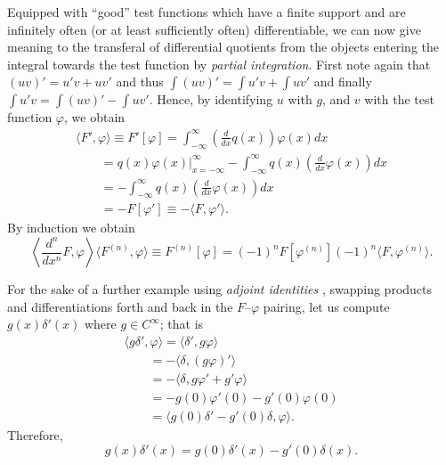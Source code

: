 Equipped with ``good'' test functions
which have a finite support and are
infinitely often (or at least sufficiently often) differentiable,
we can now give meaning to the transferal  of differential quotients from
the objects entering the integral towards the test function by {\em partial integration}.
First note again that $(uv)' = u'v+uv'$
and thus
$\int (uv)' = \int u'v+\int uv'$
and finally   $\int u'v = \int (uv)'  -\int uv'$.
Hence,     by identifying $u$ with $g$, and $v$ with the test function $\varphi$, we obtain
\begin{equation}
\begin{split}
\langle {F}' , \varphi \rangle \equiv {F}'\left[\varphi\right] =
\int_{-\infty}^\infty
\left( \frac{d}{dx} q(x)\right) \varphi (x) dx
\\
\qquad =
\left. q(x) \varphi (x) \right|_{x=-\infty}^\infty
- \int_{-\infty}^\infty
q(x)\left( \frac{d}{dx} \varphi (x) \right) dx \\
\qquad =
- \int_{-\infty}^\infty
q(x)\left( \frac{d}{dx} \varphi (x) \right) dx \\
\qquad =-F\left[\varphi  '\right] \equiv - \langle {F} , \varphi '\rangle .
\end{split}
\end{equation}
By induction we obtain
\begin{equation}
\left\langle \frac{d^{n}}{dx^{n}}{F} , \varphi \right\rangle
\langle {F}^{(n)} , \varphi \rangle \equiv F^{(n)}\left[\varphi\right]
 =(-1)^n F\left[\varphi  ^{(n)}\right]
 (-1)^n   \langle {F} , \varphi^{(n)}\rangle.
\end{equation}


{
\color{blue}
\bexample
For the sake of a further example using {\em adjoint identities}
,
swapping products and differentiations forth and back
in the $F$--$\varphi$ pairing, let us compute
$g(x)\delta' (x)$ where $g \in C^\infty$; that is
\begin{equation}
\begin{split}
\langle g \delta'   , \varphi \rangle
=
\langle \delta'   , g  \varphi \rangle
\\
\qquad =
- \langle \delta   , (g  \varphi )'\rangle
\\
\qquad =
- \langle \delta   ,  g  \varphi  '+ g'  \varphi  \rangle
\\
\qquad =
-  g(0)  \varphi ' (0) - g'(0)  \varphi(0)
\\
\qquad =
  \langle g(0) \delta '   -  g'(0)\delta , \varphi   \rangle
.
\end{split}
\end{equation}
\eexample
}
Therefore,
\begin{equation}
g(x)\delta' (x)=g(0) \delta '(x)   -  g'(0)\delta (x) .
\label{2012-m-ch-di-sederi}
\end{equation}




